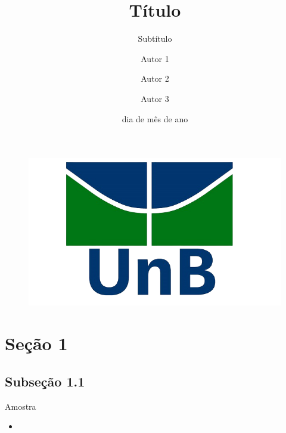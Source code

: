 \documentclass[xcolor={dvipsnames}]{beamer}
\title[Título]{Título}
\subtitle{Subtítulo}
\author[Sobrenome 1 \and Sobrenome 2 \and Sobrenome 3]{Autor 1 \and Autor 2 \and Autor 3}
\institute[UnB]{UnB - Universidade de Brasília}
\date{dia de mês de ano}
\begin{document}
\begin{frame}
    \titlepage
    \begin{figure}[htpb]
            \includegraphics[width=0.225\linewidth, left]{download.png}
    \end{figure}
\end{frame}


\begin{frame}
    \tableofcontents
\end{frame}

\section{Seção 1}
\begin{frame}
    \tableofcontents[currentsection]
\end{frame}
\subsection{Subseção 1.1}
\begin{frame}{Amostra}
    \begin{itemize}
        \item 
    \end{itemize}
\end{frame}
\end{document}
